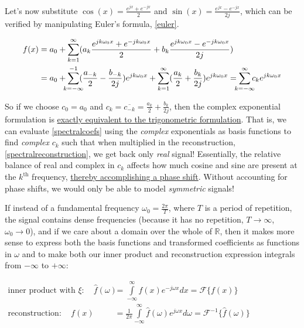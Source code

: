 \documentclass[10pt]{article}
\begin{document}
Let's now substitute $\cos(x) = \frac{e^{jx} + e^{-jx}}{2}$ and $\sin(x) = \frac{e^{jx} - e^{-jx}}{2j}$, which can be verified by manipulating Euler's formula, \autoref{euler}.\vspace{-2mm}

\begin{align*}
f(x) &= a_0 + \sum_{k=1}^{\infty} (a_k \frac{e^{j k \omega_0 x} + e^{-j k \omega_0 x}}{2} + b_k \frac{e^{j k \omega_0 x} - e^{-j k \omega_0 x}}{2j}) \\
&= a_0 + \sum_{\mathclap{k = -\infty}}^{-1} (\frac{a_{-k}}{2} - \frac{b_{-k}}{2j}) e^{j k \omega_0 x} + \sum_{k = 1}^{\infty} (\frac{a_k}{2} + \frac{b_k}{2j}) e^{j k \omega_0 x} = \sum_{\mathclap{k = -\infty}}^{\infty} c_k e^{j k \omega_0 x}
\end{align*}

\label{phase}
\noindent So if we choose $c_0 = a_0$ and $c_k = \overline{c_{-k}} = \frac{a_k}{2} + \frac{b_k}{2j}$, then the complex exponential formulation is \href{http://lpsa.swarthmore.edu/Fourier/Series/DerFS.html}{exactly equivalent to the trigonometric formulation}\cite{swarthmore}. That is, we can evaluate \autoref{spectralcoefs} using the \textit{complex} exponentials as basis functions to find \textit{complex} $c_k$ such that when multiplied in the reconstruction, \autoref{spectralreconstruction}, we get back only \textit{real} signal! Essentially, the relative balance of real and complex in $c_k$ affects how much cosine and sine are present at the $k^\text{th}$ frequency, \href{https://dsego.github.io/demystifying-fourier/}{thereby accomplishing a phase shift}\cite{sego}. Without accounting for phase shifts, we would only be able to model \textit{symmetric} signals!

If instead of a fundamental frequency $\omega_0 = \frac{2\pi}{T}$, where $T$ is a period of repetition, the signal contains dense frequencies (because it has no repetition, $T \rightarrow \infty$, $\omega_0 \rightarrow 0$), and if we care about a domain over the whole of $\mathbb{R}$, then it makes more sense to express both the basis functions and transformed coefficients as functions in $\omega$ and to make both our inner product and reconstruction expression integrals from $-\infty$ to $+\infty$:

\begin{equation}\label{pair}
\begin{aligned}
\text{inner product with }\xi\!:\quad\hat{f}(\omega) &= \int\limits_{-\infty}^{\infty} f(x) e^{-j \omega x} dx = \mathcal{F}\{f(x)\}\hspace{3cm} \\
\text{reconstruction}\!:\quad f(x) &= \frac{1}{2\pi} \int\limits_{-\infty}^{\infty} \hat{f}(\omega) e^{j \omega x} d \omega = \mathcal{F}^{-1}\{\hat{f}(\omega)\}
\end{aligned}
\end{equation}
\end{document}
